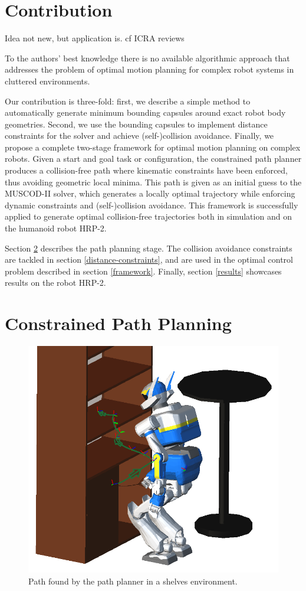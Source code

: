 \section{Contribution}
Idea not new, but application is. cf ICRA reviews

To the authors' best knowledge there is no available algorithmic
approach that addresses the problem of optimal motion planning for
complex robot systems in cluttered environments.

Our contribution is three-fold: first, we describe a simple method to
automatically generate minimum bounding capsules around exact robot
body geometries. Second, we use the bounding capsules to implement
distance constraints for the solver and achieve (self-)collision
avoidance. Finally, we propose a complete two-stage framework for
optimal motion planning on complex robots. Given a start and goal task
or configuration, the constrained path planner produces a
collision-free path where kinematic constraints have been enforced,
thus avoiding geometric local minima. This path is given as an initial
guess to the \textsc{MUSCOD-II} solver, which generates a locally
optimal trajectory while enforcing dynamic constraints and
(self-)collision avoidance. This framework is successfully applied to
generate optimal collision-free trajectories both in simulation and on
the humanoid robot HRP-2.

Section \ref{path-planning} describes the path planning stage. The
collision avoidance constraints are tackled in section
\ref{distance-constraints}, and are used in the optimal control
problem described in section \ref{framework}. Finally, section
\ref{results} showcases results on the robot HRP-2.

\section{Constrained Path Planning}
\label{path-planning}

\begin{figure}
\centering
\includegraphics[width=0.8\linewidth]
                {src/chap3-optimal-motion-planning/figure/shelves-path.png}
\caption{Path found by the path planner in a shelves environment.}
\label{path}
\end{figure}

